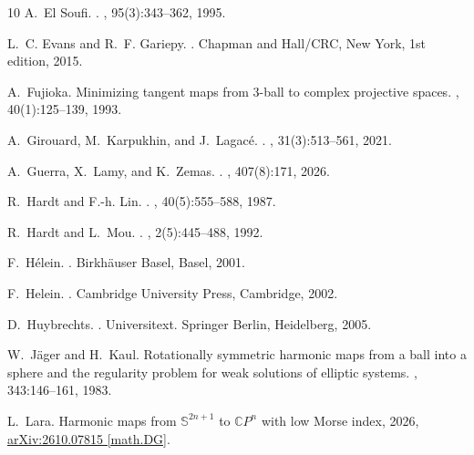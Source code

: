 \documentclass[11pt]{article}
\theoremstyle{plain}
\numberwithin{equation}{section}
\theoremstyle{definition}
\begin{document}
\begin{thebibliography}{10}
A.~{El Soufi}.
.
, 95(3):343--362, 1995.

L.~C. Evans and R.~F. Gariepy.
.
\newblock Chapman and Hall/CRC, New York, 1st edition, 2015.

A.~Fujioka.
\newblock Minimizing tangent maps from {$3$}-ball to complex projective spaces.
, 40(1):125--139,
  1993.

A.~Girouard, M.~Karpukhin, and J.~Lagac{\'{e}}.
.
, 31(3):513--561, 2021.

A.~Guerra, X.~Lamy, and K.~Zemas.
.
, 407(8):171, 2026.

R.~Hardt and F.-h. Lin.
.
, 40(5):555--588, 1987.

R.~Hardt and L.~Mou.
.
, 2(5):445--488, 1992.

F.~H{\'{e}}lein.
.
\newblock Birkh{\"{a}}user Basel, Basel, 2001.

F.~Helein.
.
\newblock Cambridge University Press, Cambridge, 2002.

D.~Huybrechts.
.
\newblock Universitext. Springer Berlin, Heidelberg, 2005.

W.~J{\"a}ger and H.~Kaul.
\newblock Rotationally symmetric harmonic maps from a ball into a sphere and
  the regularity problem for weak solutions of elliptic systems.
, 343:146--161, 1983.

L.~Lara.
\newblock Harmonic maps from {$\mathbb{S}^{2n+1}$} to {$\mathbb{C}P^n$} with
  low {Morse} index, 2026, \href{http://arxiv.org/abs/2610.07815}{{\ttfamily
  arXiv:2610.07815 [math.DG]}}.


\end{thebibliography}
\end{document}
